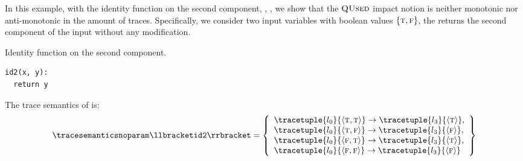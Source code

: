 \begin{example}
In this example, with the identity function on the second component, \cf{}, , we show that the $\textup{\textsc{QUsed}}$ impact notion is neither monotonic nor anti-monotonic in the amount of traces.
Specifically, we consider two input variables with boolean values $\{\textsc{t}, \textsc{f}\}$, the  returns the second component of the input without any modification.
\begin{marginlisting}
  \caption{Identity function on the second component.}
  \vspace{25pt}
\begin{lstlisting}[language=customPython]
id2(x, y):
  return y
 \end{lstlisting}
\end{marginlisting}
The trace semantics of  is:
\begin{align*}
  \tracesemanticsnoparam\semanticsof{\texttt{id2}}
  =
  \left\{
    \begin{array}{l}
      \tracetuple{\locinit}{\langle \true, \true\rangle}\rightarrow\tracetuple{\loc{3}}{\langle \true\rangle}, \\
      \tracetuple{\locinit}{\langle \true, \false\rangle}\rightarrow\tracetuple{\loc{3}}{\langle \false\rangle}, \\
      \tracetuple{\locinit}{\langle \false, \true\rangle}\rightarrow\tracetuple{\loc{3}}{\langle \true\rangle}, \\
      \tracetuple{\locinit}{\langle \false, \false\rangle}\rightarrow\tracetuple{\loc{3}}{\langle \false\rangle}
    \end{array}
    \right\}
\end{align*}
\begin{marginfigure}
\end{marginfigure}
\end{example}
